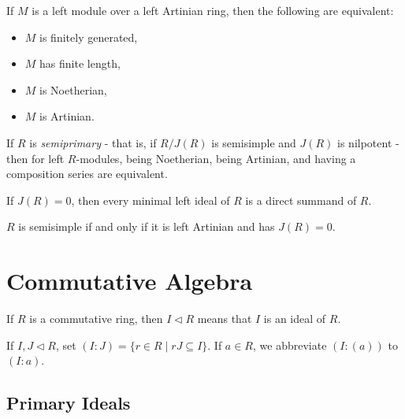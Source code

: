 \documentclass[letterpaper,11pt]{report}
\begin{document}
\begin{thm} If $M$ is a left module over a left Artinian ring, then the following are equivalent:
\begin{itemize}
\item $M$ is finitely generated,
\item $M$ has finite length,
\item $M$ is Noetherian,
\item $M$ is Artinian.
\end{itemize}
\end{thm}

\begin{thm} If $R$ is \emph{semiprimary} - that is, if $R/J(R)$ is semisimple and $J(R)$ is nilpotent - then for left $R$-modules, being Noetherian, being Artinian, and having a composition series are equivalent.
\end{thm}

\begin{prop} If $J(R) = 0$, then every minimal left ideal of $R$ is a direct summand of $R$.
\end{prop}

\begin{thm} $R$ is semisimple if and only if it is left Artinian and has $J(R) = 0$.
\end{thm}






\section{Commutative Algebra}

\begin{defn} If $R$ is a commutative ring, then $I \lhd R$ means that $I$ is an ideal of $R$.
\end{defn}

\begin{defn} If $I,J \lhd R$, set $(I:J) = \{r \in R \mid rJ \subseteq I\}$. If $a \in R$, we abbreviate $(I:(a))$ to $(I:a)$.
\end{defn}

\subsection{Primary Ideals}
\end{document}

